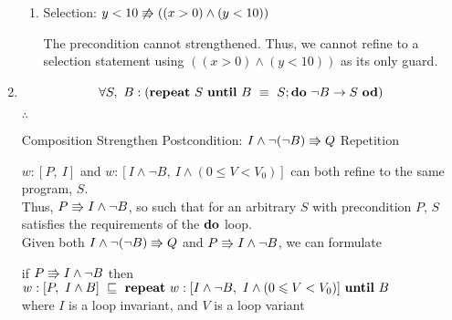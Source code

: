 \documentclass{article}
\begin{document}
\begin{enumerate}
\begin{enumerate}
    \item 
        \DERIVE
        \hint{\doesntrefsto} {Selection: $y < 10 \not\Rrightarrow ((x > 0) \land (y < 10))$}

        \ENDDERIVE

        The precondition cannot strengthened. Thus, we cannot refine to a selection statement using $((x > 0) \land (y < 10))$ as its only guard.
    \end{enumerate}
\item

    \[\forall S,\ B : (\Repeat\ S\ \Until\ B ~\equiv~ S; \Do\ \neg B \rightarrow S\ \Od)\]

    $\therefore$

    \DERIVE
     {Composition}
     {Strengthen Postcondition: $I \land \neg(\neg B) \Rrightarrow Q$}
     {Repetition}
    \ENDDERIVE

    $w: [P,\ I]$ and $w:[I \land \neg B,\ I \land (0 \leqslant V < V_0)]$ can both refine to the same program, $S$.\\

    Thus, $P \Rrightarrow I \land \neg B$, so such that for an arbitrary $S$ with precondition $P$, $S$ satisfies the requirements of the ${\bf do}$ loop.\\

    Given both $I \land \neg(\neg B) \Rrightarrow Q$ and $P \Rrightarrow I \land \neg B$, we can formulate\\

    \begin{center}
    if $P \Rrightarrow I \land \neg B$ then $w:[P,\ I \land B] ~\refsto~ \Repeat\ w:[I \land \neg B,\ I \land (0 \leqslant V < V_0)]\ \Until\ B$\\
    where $I$ is a loop invariant, and $V$ is a loop variant
    \end{center}

\end{enumerate}


\end{document}
